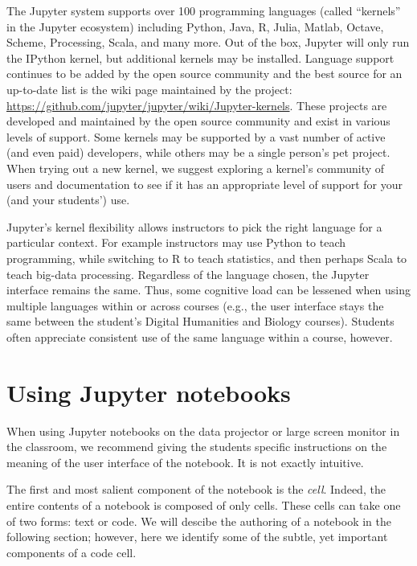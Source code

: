 \documentclass[]{book}
\begin{document}
The Jupyter system supports over 100 programming languages (called
``kernels'' in the Jupyter ecosystem) including Python, Java, R, Julia,
Matlab, Octave, Scheme, Processing, Scala, and many more. Out of the
box, Jupyter will only run the IPython kernel, but additional kernels
may be installed. Language support continues to be added
by the open source community and the best source for an up-to-date list is the wiki page maintained by the project:
\url{https://github.com/jupyter/jupyter/wiki/Jupyter-kernels}.
These projects
are developed and maintained by the open source community and exist in
various levels of support. Some kernels may be supported
by a vast number of active (and even paid) developers, while others
may be a single person's pet project. When trying out a new kernel, we
suggest exploring a kernel's community of users and documentation to
see if it has an appropriate level of support for your (and your
students') use.

Jupyter's kernel flexibility allows instructors to pick the right
language for a particular context. For example instructors may use
Python to teach programming, while switching to R to teach statistics,
and then perhaps Scala to teach big-data processing. Regardless of the
language chosen, the Jupyter interface remains the same. Thus, some
cognitive load can be lessened when using multiple languages within or
across courses (e.g., the user interface stays the same between
the student's Digital Humanities and Biology courses).
Students often appreciate consistent use of the same language within a course, however.

\hypertarget{using-jupyter-notebooks}{%
\section{Using Jupyter notebooks}\label{using-jupyter-notebooks}}

When using Jupyter notebooks on the data projector or large screen
monitor in the classroom, we recommend giving the students specific
instructions on the meaning of the user interface of the notebook. It
is not exactly intuitive.

The first and most salient component of the notebook is the
\emph{cell}. Indeed, the entire contents of a notebook is composed of
only cells. These cells can take one of two forms: text or code. We
will descibe the authoring of a notebook in the following section;
however, here we identify some of the subtle, yet important components
of a code cell.
\end{document}
